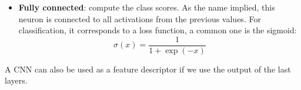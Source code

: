\begin{itemize}
    \item \textbf{Fully connected}: compute the class scores. As the name implied, this neuron is connected to all activations from the previous values. For classification, it corresponds to a loss function, a common one is the sigmoid:
    $$ \sigma (x) = \frac{1}{1 + \exp(-x)}$$
\end{itemize}

A CNN can also be used as a feature descriptor if we use the output of the last layers.

